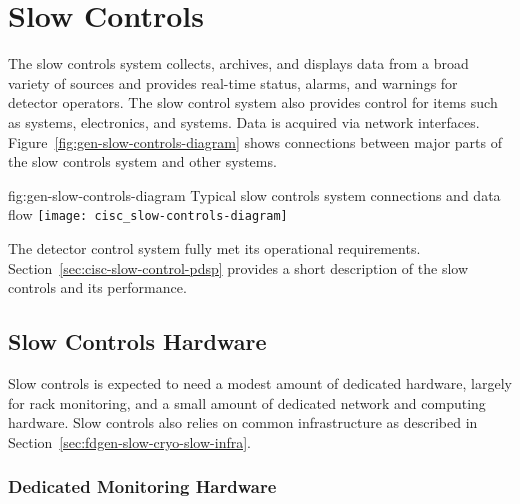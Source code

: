 \section{Slow Controls}

The slow controls system collects, archives, and displays data from
a broad variety of sources and provides real-time status, alarms, and warnings for detector operators. The slow control system also provides control for %
items such as  systems,  electronics, and  systems. Data is acquired via network interfaces.  Figure~\ref{fig:gen-slow-controls-diagram} shows connections between major parts of the slow controls system and other systems. %

\begin{dunefigure}{fig:gen-slow-controls-diagram}
{Typical slow controls system connections and data flow}
\texttt{[image: cisc\_slow-controls-diagram]}
\end{dunefigure}

The  detector control system\cite{pdspdcs_proc} fully met its operational requirements. %
Section~\ref{sec:cisc-slow-control-pdsp} provides a short description of the  slow controls and its performance.

 \subsection{Slow Controls Hardware}
\label{sec:fdgen-slow-cryo-hdwr}

Slow controls is expected to need a modest amount of dedicated hardware, largely for rack monitoring,  %
and a small amount of dedicated network and
computing hardware. %
Slow controls also relies on common
infrastructure as described in
Section~\ref{sec:fdgen-slow-cryo-slow-infra}.

\subsubsection{Dedicated Monitoring Hardware}

